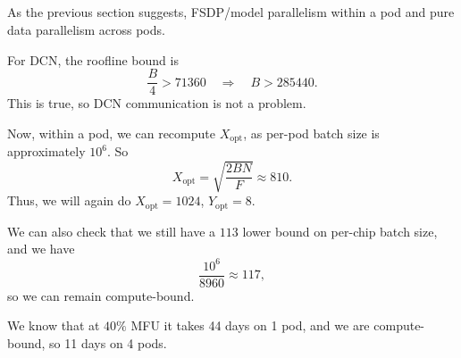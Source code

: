 \documentclass[11pt]{article}
\newcommand{\B}{B}
\newcommand{\F}{F}
\newcommand{\exercisebreak}{\Needspace{8\baselineskip}}
\begin{document}
\exercisebreak
\subsection{}
As the previous section suggests, FSDP/model parallelism within a pod and pure data parallelism across pods.

For DCN, the roofline bound is
\[
  \frac{\B}{4}>71360
  \quad\Longrightarrow\quad
  \B>285440.
\]
This is true, so DCN communication is not a problem.

Now, within a pod, we can recompute $X_{\mathrm{opt}}$, as per-pod batch size is approximately $10^6$. So
\[
  X_{\mathrm{opt}}=\sqrt{\frac{2BN}{\F}}\approx 810.
\]
Thus, we will again do $X_{\mathrm{opt}}=1024$, $Y_{\mathrm{opt}}=8$.

We can also check that we still have a $113$ lower bound on per-chip batch size, and we have
\[
  \frac{10^6}{8960}\approx 117,
\]
so we can remain compute-bound.

We know that at $40\%$ MFU it takes 44 days on 1 pod, and we are compute-bound, so 11 days on 4 pods.

\exercisebreak
\end{document}
